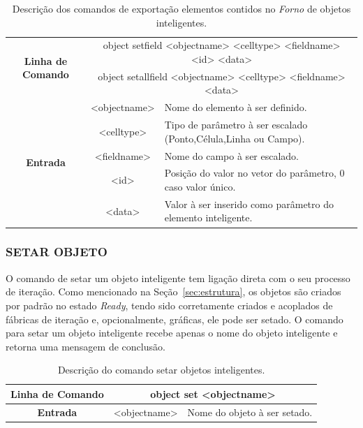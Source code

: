 \documentclass[a4paper,12pt]{monografia}
\theoremstyle{plain}
\theoremstyle{definition}
\theoremstyle{remark}
\begin{document}
\begin{center}
	\begin{table}[!htbp]
		\begin{tabular}{|c|c|m{}|}
			\hline
			\multirow{2}{*}{\textbf{Linha de Comando}} & \multicolumn{2}{c|}{object set\underline{\space\space}field <object\underline{\space\space}name> <cell\underline{\space\space}type> <field\underline{\space\space}name> <id> <data>} \\
			& \multicolumn{2}{c|}{object set\underline{\space\space}all\underline{\space\space}field <object\underline{\space\space}name> <cell\underline{\space\space}type> <field\underline{\space\space}name> <data>} \\
			\hline
			\multirow{5}{*}{\textbf{Entrada}} & <object\underline{\space\space}name> & Nome do elemento à ser definido. \\
			& <cell\underline{\space\space}type> & Tipo de parâmetro à ser escalado (Ponto,Célula,Linha ou Campo). \\
			& <field\underline{\space\space}name> & Nome do campo à ser escalado. \\
			& <id> & Posição do valor no vetor do parâmetro, 0 caso valor único. \\
			& <data> & Valor à ser inserido como parâmetro do elemento inteligente. \\
			\hline
		\end{tabular}
		\caption{Descrição dos comandos de exportação elementos contidos no \textit{Forno} de objetos inteligentes.}
		\label{tab:set_field_object}
	\end{table}
\end{center}

\subsubsection{SETAR OBJETO}\label{sec:set_object}

O comando de setar um objeto inteligente tem ligação direta com o seu processo de iteração. Como mencionado na Seção~\ref{sec:estrutura}, os objetos são criados por padrão no estado \textit{Ready}, tendo sido corretamente criados e acoplados de fábricas de iteração e, opcionalmente, gráficas, ele pode ser setado. O comando para setar um objeto inteligente recebe apenas o nome do objeto inteligente e retorna uma mensagem de conclusão.

\begin{center}
	\begin{table}[!htbp]
		\begin{tabular}{|c|c|m{}|}
			\hline
			\textbf{Linha de Comando} & \multicolumn{2}{c|}{object set <object\underline{\space\space}name>} \\
			\hline
			\textbf{Entrada} & <object\underline{\space\space}name> & Nome do objeto à ser setado. \\
			\hline
		\end{tabular}
		\caption{Descrição do comando setar objetos inteligentes.}
		\label{tab:set_object}
	\end{table}
\end{center}
\end{document}
